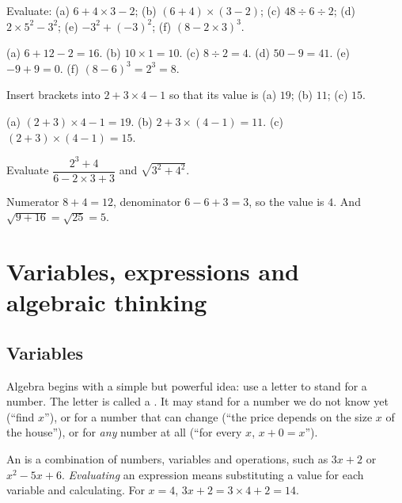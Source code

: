 \sectionexercises

\begin{exercise}
Evaluate: (a) $6 + 4\times3 - 2$; (b) $(6+4)\times(3-2)$; (c) $48\div6\div2$;
(d) $2\times5^2 - 3^2$; (e) $-3^2 + (-3)^2$; (f) $(8 - 2\times3)^3$.
\end{exercise}
\begin{solution}
(a) $6 + 12 - 2 = 16$. (b) $10 \times 1 = 10$. (c) $8 \div 2 = 4$.
(d) $50 - 9 = 41$. (e) $-9 + 9 = 0$. (f) $(8-6)^3 = 2^3 = 8$.
\end{solution}

\begin{exercise}
Insert brackets into $2 + 3 \times 4 - 1$ so that its value is (a) $19$;
(b) $11$; (c) $15$.
\end{exercise}
\begin{solution}
(a) $(2+3)\times4 - 1 = 19$. (b) $2 + 3\times(4-1) = 11$.
(c) $(2+3)\times(4-1) = 15$.
\end{solution}

\begin{exercise}
Evaluate $\dfrac{2^3 + 4}{6 - 2\times 3 + 3}$ and $\sqrt{3^2 + 4^2}$.
\end{exercise}
\begin{solution}
Numerator $8 + 4 = 12$, denominator $6 - 6 + 3 = 3$, so the value is $4$.
And $\sqrt{9 + 16} = \sqrt{25} = 5$.
\end{solution}

\section{Variables, expressions and algebraic thinking}\label{sec:algebra}

\subsection{Variables}

Algebra begins with a simple but powerful idea: use a letter to stand for a
number. The letter is called a . It may stand for a number we
do not know yet (``find $x$''), or for a number that can change (``the price
depends on the size $x$ of the house''), or for \emph{any} number at all (``for
every $x$, $x + 0 = x$'').

An  is a combination of numbers, variables and operations,
such as $3x + 2$ or $x^2 - 5x + 6$. \emph{Evaluating} an expression means
substituting a value for each variable and calculating. For $x = 4$,
$3x + 2 = 3 \times 4 + 2 = 14$.

